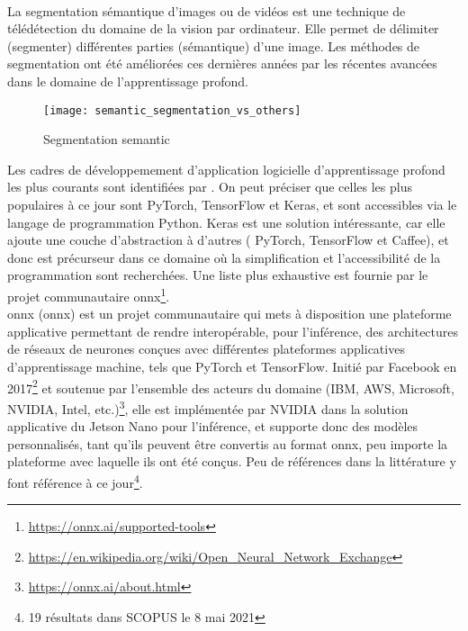 \vspace{0.5\baselineskip}
\\
\noindent La segmentation sémantique d'images ou de vidéos est une technique de télédétection du domaine de la vision par ordinateur. Elle permet de délimiter (segmenter) différentes parties (sémantique) d'une image. Les méthodes de segmentation ont été améliorées ces dernières années par les récentes avancées dans le domaine de l'apprentissage profond. 
\begin{figure}[H]
   \centering
   \texttt{[image: semantic\_segmentation\_vs\_others]}
   \caption[Segmentation semantic]{Segmentation semantic\parencite[p.~1]{wu_recent_2019}}
   \label{fig:semantic_segmentation_vs_others}
\end{figure}
\noindent Les cadres de développemement d'application logicielle d'apprentissage profond les plus courants sont identifiées par \parencite{cornioley_integration_2018}. On peut préciser que celles les plus populaires à ce jour sont PyTorch, TensorFlow et Keras, et sont accessibles via le langage de programmation Python. Keras est une solution intéressante, car elle ajoute une couche d'abstraction à d'autres ( PyTorch, TensorFlow et Caffee), et donc est précurseur dans ce domaine où la simplification et l'accessibilité de la programmation sont recherchées. Une liste plus exhaustive est fournie par le projet communautaire \acrshort{onnx}\footnote{\url{https://onnx.ai/supported-tools}}.
\vspace{0.5\baselineskip}
\\
\noindent \acrshort{onnx} (\acrlong{onnx}) est un projet communautaire qui mets à disposition une plateforme applicative permettant de rendre interopérable, pour l'inférence, des architectures de réseaux de neurones conçues avec différentes plateformes applicatives d'apprentissage machine, tels que PyTorch et TensorFlow. Initié par Facebook en 2017\footnote{\url{https://en.wikipedia.org/wiki/Open_Neural_Network_Exchange}} et soutenue par l'ensemble des acteurs du domaine (IBM, AWS, Microsoft, NVIDIA, Intel, etc.)\footnote{\url{https://onnx.ai/about.html}}, elle est implémentée par NVIDIA dans la solution applicative du Jetson Nano pour l'inférence, et supporte donc des modèles personnalisés, tant qu'ils peuvent être convertis au format \acrshort{onnx}, peu importe la plateforme avec laquelle ils ont été conçus. Peu de références dans la littérature y font référence à ce jour\footnote{19 résultats dans SCOPUS le 8 mai 2021}.